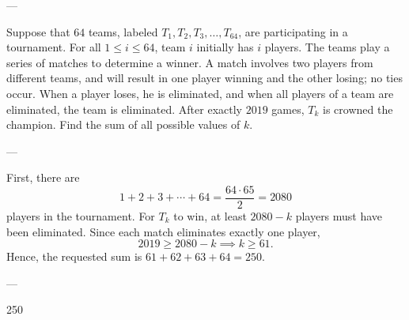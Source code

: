 
---

Suppose that $64$ teams, labeled $T_1,T_2,T_3,\ldots,T_{64}$, are participating in a tournament. For all $1\le i\le 64$, team $i$ initially has $i$ players. The teams play a series of matches to determine a winner. A match involves two players from different teams, and will result in one player winning and the other losing; no ties occur. When a player loses, he is eliminated, and when all players of a team are eliminated, the team is eliminated. After exactly $2019$ games, $T_k$ is crowned the champion. Find the sum of all possible values of $k$.

---

First, there are \[1+2+3+\cdots+64=\frac{64\cdot 65}2=2080\]
players in the tournament. For $T_k$ to win, at least $2080-k$ players must have been eliminated. Since each match eliminates exactly one player, \[2019\ge 2080-k\implies k\ge 61.\]
Hence, the requested sum is $61+62+63+64=250$.

---

250
